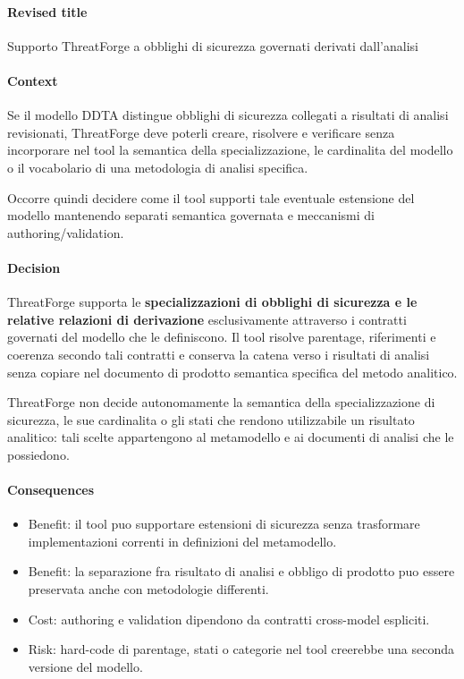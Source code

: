 \documentclass[
  10pt,
]{article}
\providecommand{\tightlist}{%
  \setlength{\itemsep}{0pt}\setlength{\parskip}{0pt}}
\begin{document}
\paragraph{Revised title}\label{revised-title-7}

Supporto ThreatForge a obblighi di sicurezza governati derivati
dall'analisi

\paragraph{Context}\label{context-15}

Se il modello DDTA distingue obblighi di sicurezza collegati a risultati
di analisi revisionati, ThreatForge deve poterli creare, risolvere e
verificare senza incorporare nel tool la semantica della
specializzazione, le cardinalita del modello o il vocabolario di una
metodologia di analisi specifica.

Occorre quindi decidere come il tool supporti tale eventuale estensione
del modello mantenendo separati semantica governata e meccanismi di
authoring/validation.

\paragraph{Decision}\label{decision-15}

ThreatForge supporta le \textbf{specializzazioni di obblighi di
sicurezza e le relative relazioni di derivazione} esclusivamente
attraverso i contratti governati del modello che le definiscono. Il tool
risolve parentage, riferimenti e coerenza secondo tali contratti e
conserva la catena verso i risultati di analisi senza copiare nel
documento di prodotto semantica specifica del metodo analitico.

ThreatForge non decide autonomamente la semantica della specializzazione
di sicurezza, le sue cardinalita o gli stati che rendono utilizzabile un
risultato analitico: tali scelte appartengono al metamodello e ai
documenti di analisi che le possiedono.

\paragraph{Consequences}\label{consequences-15}

\begin{itemize}
\tightlist
\item
  Benefit: il tool puo supportare estensioni di sicurezza senza
  trasformare implementazioni correnti in definizioni del metamodello.
\item
  Benefit: la separazione fra risultato di analisi e obbligo di prodotto
  puo essere preservata anche con metodologie differenti.
\item
  Cost: authoring e validation dipendono da contratti cross-model
  espliciti.
\item
  Risk: hard-code di parentage, stati o categorie nel tool creerebbe una
  seconda versione del modello.
\end{itemize}
\end{document}
